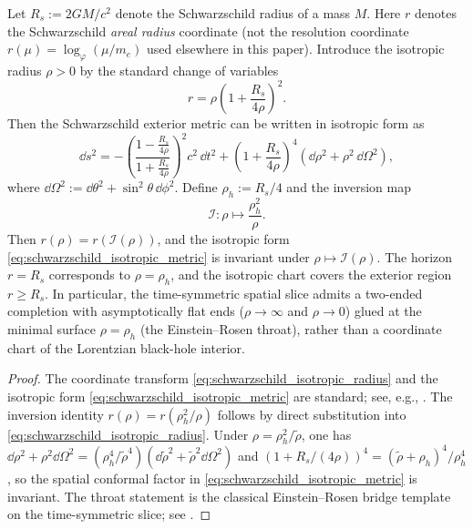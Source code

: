 \begin{proposition}
\label{prop:er_isotropic_inversion}
Let $R_s:=2GM/c^2$ denote the Schwarzschild radius of a mass $M$.
Here $r$ denotes the Schwarzschild \emph{areal radius} coordinate (not the resolution coordinate $r(\mu)=\log_\varphi(\mu/m_e)$ used elsewhere in this paper).
Introduce the isotropic radius $\rho>0$ by the standard change of variables
\begin{equation}\label{eq:schwarzschild_isotropic_radius}
r=\rho\left(1+\frac{R_s}{4\rho}\right)^2.
\end{equation}
Then the Schwarzschild exterior metric can be written in isotropic form as
\begin{equation}\label{eq:schwarzschild_isotropic_metric}
\dd s^2
=-\left(\frac{1-\frac{R_s}{4\rho}}{1+\frac{R_s}{4\rho}}\right)^2 c^2\,\dd t^2
+\left(1+\frac{R_s}{4\rho}\right)^4\left(\dd\rho^2+\rho^2\,\dd\Omega^2\right),
\end{equation}
where $\dd\Omega^2:=\dd\theta^2+\sin^2\theta\,\dd\phi^2$.
Define $\rho_h:=R_s/4$ and the inversion map
\begin{equation}\label{eq:schwarzschild_isotropic_inversion}
\mathcal{I}:\rho\mapsto \frac{\rho_h^2}{\rho}.
\end{equation}
Then $r(\rho)=r(\mathcal{I}(\rho))$, and the isotropic form \eqref{eq:schwarzschild_isotropic_metric} is invariant under $\rho\mapsto\mathcal{I}(\rho)$.
The horizon $r=R_s$ corresponds to $\rho=\rho_h$, and the isotropic chart covers the exterior region $r\ge R_s$.
In particular, the time-symmetric spatial slice admits a two-ended completion with asymptotically flat ends ($\rho\to\infty$ and $\rho\to 0$) glued at the minimal surface $\rho=\rho_h$ (the Einstein--Rosen throat), rather than a coordinate chart of the Lorentzian black-hole interior.
\end{proposition}
\begin{proof}
The coordinate transform \eqref{eq:schwarzschild_isotropic_radius} and the isotropic form \eqref{eq:schwarzschild_isotropic_metric} are standard; see, e.g., \cite{Wald1984}.
The inversion identity $r(\rho)=r(\rho_h^2/\rho)$ follows by direct substitution into \eqref{eq:schwarzschild_isotropic_radius}.
Under $\rho=\rho_h^2/\tilde{\rho}$, one has $\dd\rho^2+\rho^2\dd\Omega^2=(\rho_h^4/\tilde{\rho}^4)(\dd\tilde{\rho}^2+\tilde{\rho}^2\dd\Omega^2)$ and $\left(1+R_s/(4\rho)\right)^4=(\tilde{\rho}+\rho_h)^4/\rho_h^4$, so the spatial conformal factor in \eqref{eq:schwarzschild_isotropic_metric} is invariant.
The throat statement is the classical Einstein--Rosen bridge template on the time-symmetric slice; see \cite{EinsteinRosen1935,Kruskal1960,Wald1984}.
\end{proof}

